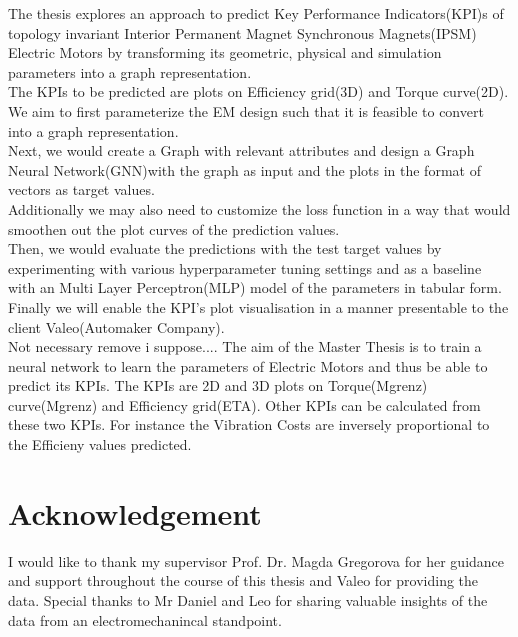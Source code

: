 \documentclass{report} %
\begin{document}
The thesis explores an approach to predict Key Performance Indicators(KPI)s of topology invariant Interior Permanent Magnet Synchronous Magnets(IPSM) Electric Motors by transforming its geometric, physical and simulation parameters into a graph representation. \\
The KPIs to be predicted are plots on Efficiency grid(3D) and Torque curve(2D).\\
We aim to first parameterize the EM design such that it is feasible to convert into a graph representation. \\
Next, we would create a Graph with relevant attributes and design a Graph Neural Network(GNN)with the graph as input and the plots in the format of vectors as target values.\\
Additionally we may also need to customize the loss function in a way that would smoothen out the plot curves of the prediction values.\\
Then, we would evaluate the predictions with the test target values by experimenting with various hyperparameter tuning settings and as a baseline with an Multi Layer Perceptron(MLP) model of the parameters in tabular form.\\
Finally we will enable the KPI's plot visualisation in a manner presentable to the client Valeo(Automaker Company).\\
Not necessary remove i suppose....
The aim of the Master Thesis is to train a neural network to learn the parameters of Electric Motors and thus be able to predict its KPIs.
The KPIs are 2D and 3D plots on Torque(Mgrenz) curve(Mgrenz) and Efficiency grid(ETA). Other KPIs can be calculated from these two KPIs.
For instance the Vibration Costs are inversely proportional to the Efficieny values predicted. 


\newpage 

\newpage 

\chapter*{Acknowledgement}
I would like to thank my supervisor Prof. Dr. Magda Gregorova for her guidance and support throughout the course of this thesis and Valeo for providing the data.
Special thanks to Mr Daniel and Leo for sharing valuable insights of the data from an electromechanincal standpoint.

\newpage

\newpage
\end{document}
